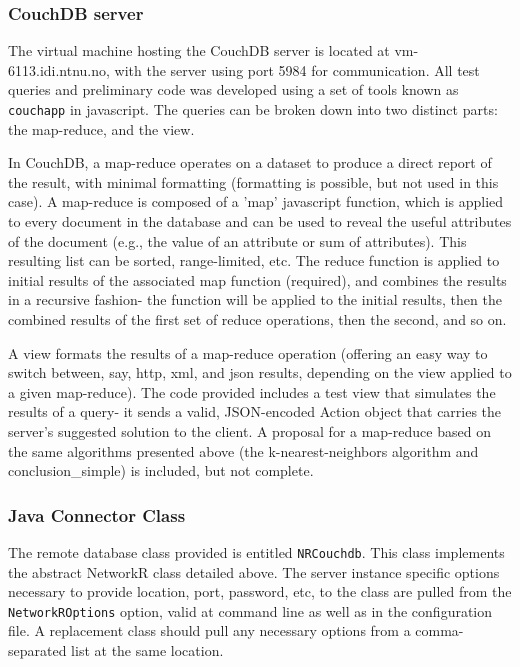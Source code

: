 \subsubsection{CouchDB server}
The virtual machine hosting the CouchDB server is located at vm-6113.idi.ntnu.no, with the server using port 5984 for communication. All test queries and preliminary code was developed using a set of tools known as \texttt{couchapp} in javascript. The queries can be broken down into two distinct parts: the map-reduce, and the view. 

In CouchDB, a map-reduce operates on a dataset to produce a direct report of the result, with minimal formatting (formatting is possible, but not used in this case). A  map-reduce is composed of a 'map' javascript function, which is applied to every document in the database and can be used to reveal the useful attributes of the document (e.g., the value of an attribute or sum of attributes). This resulting list can be sorted, range-limited, etc. The reduce function is applied to initial results of the associated map function (required), and combines the results in a recursive fashion- the function will be applied to the initial results, then the combined results of the first set of reduce operations, then the second, and so on. 

A view formats the results of a map-reduce operation (offering an easy way to switch between, say, http, xml, and json results, depending on the view applied to a given map-reduce).
The code provided includes a test view that simulates the results of a query- it sends a valid, JSON-encoded Action object that carries the server's suggested solution to the client. A proposal for a map-reduce based on the same algorithms presented above (the k-nearest-neighbors algorithm and conclusion\_simple) is included, but not complete.


\subsubsection{Java Connector Class}
The remote database class provided is entitled \texttt{NRCouchdb}. This class implements the abstract NetworkR class detailed above. The server instance specific options necessary to provide location, port, password, etc, to the class are pulled from the \texttt{NetworkROptions} option, valid at command line as well as in the configuration file. A replacement class should pull any necessary options from a comma-separated list at the same location.

